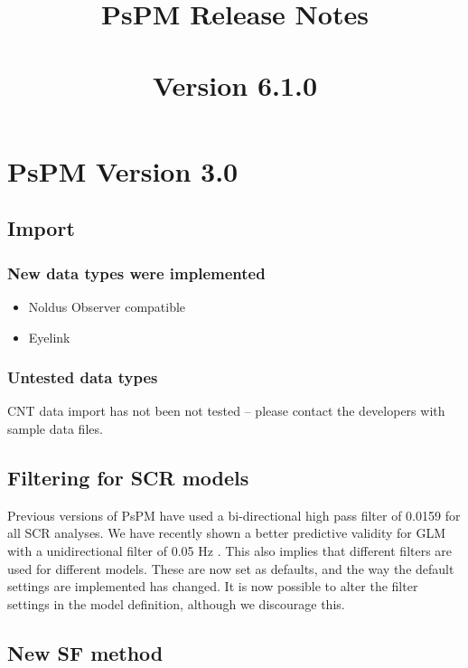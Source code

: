 \documentclass[english]{article}
\title{PsPM Release Notes\\ ~\\ Version 6.1.0}
\numberwithin{equation}{section}
\numberwithin{figure}{section}
\begin{document}
\maketitle
\date
\pagebreak


\tableofcontents{}
\pagebreak

\section{PsPM Version 3.0}

\subsection*{Import}

\subsubsection*{New data types were implemented}
\begin{itemize}
\item Noldus Observer compatible 
\item Eyelink
\end{itemize}

\subsubsection*{Untested data types}

CNT data import has not been not tested -- please contact the developers
with sample data files. 

\subsection*{Filtering for SCR models}

Previous versions of PsPM have used a bi-directional high pass filter
of 0.0159 for all SCR analyses. We have recently shown a better predictive
validity for GLM with a unidirectional filter of 0.05 Hz \cite{Bach:2013aa}.
This also implies that different filters are used for different models.
These are now set as defaults, and the way the default settings are
implemented has changed. It is now possible to alter the filter settings
in the model definition, although we discourage this.

\subsection*{New SF method}
\end{document}
